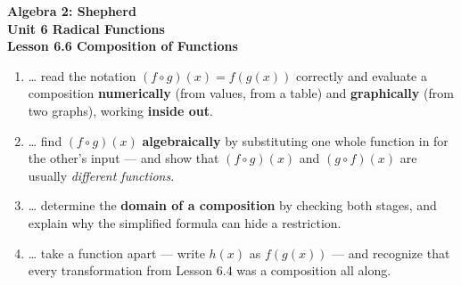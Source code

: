 \documentclass[10pt]{article}
\begin{document}
\vspace{-0.8in}

\begin{center}
  {\color{white}\textbf{\LARGE Algebra 2: Shepherd}}\\[4pt]
  {\color{forestmid}\large\textbf{Unit 6 \quad Radical Functions}}\\[6pt]
  {\color{white}\textbf{\large Lesson 6.6 \quad Composition of Functions}}
\end{center}

\vspace{0.22in}
\namedateperiod
\vspace{0.18in}

\begin{learningtargetbox}
\small
\begin{enumerate}[leftmargin=1.5em, itemsep=5pt]
  \item \ldots{} read the notation $(f\circ g)(x)=f(g(x))$ correctly and evaluate a composition \textbf{numerically} (from values, from a table) and \textbf{graphically} (from two graphs), working \textbf{inside out}.
  \item \ldots{} find $(f\circ g)(x)$ \textbf{algebraically} by substituting one whole function in for the other's input --- and show that $(f\circ g)(x)$ and $(g\circ f)(x)$ are usually \emph{different functions}.
  \item \ldots{} determine the \textbf{domain of a composition} by checking both stages, and explain why the simplified formula can hide a restriction.
  \item \ldots{} take a function apart --- write $h(x)$ as $f(g(x))$ --- and recognize that every transformation from Lesson 6.4 was a composition all along.
\end{enumerate}
\end{learningtargetbox}

\vspace{0.14in}
\end{document}

